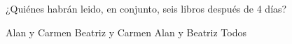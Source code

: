 ¿Quiénes habr\'an leido, en conjunto, seis libros despu\'es de 4 d\'ias?

\begin{choices}\footnotesize
    \choice Alan y Carmen
    \CorrectChoice Beatriz y Carmen
    \choice Alan y Beatriz
    \choice Todos
\end{choices}